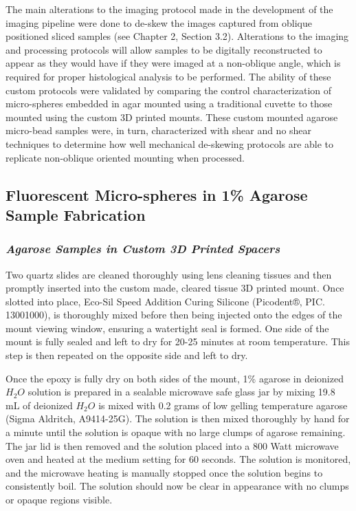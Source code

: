 The main alterations to the imaging protocol made in the development of the imaging pipeline were done to de-skew the images captured from oblique positioned sliced samples (see Chapter 2, Section 3.2). Alterations to the imaging and processing protocols will allow samples to be digitally reconstructed to appear as they would have if they were imaged at a non-oblique angle, which is required for proper histological analysis to be performed. The ability of these custom protocols were validated by comparing the control characterization of micro-spheres embedded in agar mounted using a traditional cuvette to those mounted using the custom 3D printed mounts. These custom mounted agarose micro-bead samples were, in turn, characterized with shear and no shear techniques to determine how well mechanical de-skewing protocols are able to replicate non-oblique oriented mounting when processed. 


\subsection{Fluorescent Micro-spheres in 1\% Agarose Sample Fabrication} 

\subsubsection{\textit{Agarose Samples in Custom 3D Printed Spacers}}

Two quartz slides are cleaned thoroughly using lens cleaning tissues and then promptly inserted into the custom made, cleared tissue 3D printed mount. Once slotted into place, Eco-Sil Speed Addition Curing Silicone (Picodent®, PIC. 13001000), is thoroughly mixed before then being injected onto the edges of the mount viewing window, ensuring a watertight seal is formed. One side of the mount is fully sealed and left to dry for 20-25 minutes at room temperature. This step is then repeated on the opposite side and left to dry. 

Once the epoxy is fully dry on both sides of the mount, 1\% agarose in deionized $H_2O$ solution is prepared in a sealable microwave safe glass jar by mixing 19.8 mL of deionized $H_2O$ is mixed with 0.2 grams of low gelling temperature agarose (Sigma Aldritch, A9414-25G). The solution is then mixed thoroughly by hand for a minute until the solution is opaque with no large clumps of agarose remaining. The jar lid is then removed and the solution placed into a 800 Watt microwave oven and heated at the medium setting for 60 seconds. The solution is monitored, and the microwave heating is manually stopped once the solution begins to consistently boil. The solution should now be clear in appearance with no clumps or opaque regions visible.

